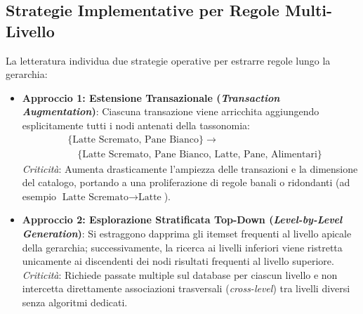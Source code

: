 \FloatBarrier
\subsection{Strategie Implementative per Regole Multi-Livello}
La letteratura individua due strategie operative per estrarre regole lungo la gerarchia:
\begin{itemize}
    \item \textbf{Approccio 1: Estensione Transazionale (\textit{Transaction Augmentation})}: Ciascuna transazione viene arricchita aggiungendo esplicitamente tutti i nodi antenati della tassonomia:
    \begin{equation}
    \begin{split}
    &\{\text{Latte Scremato, Pane Bianco}\} \longrightarrow \\
    &\quad \{\text{Latte Scremato, Pane Bianco, Latte, Pane, Alimentari}\}
    \end{split}
    \end{equation}
    \textit{Criticità}: Aumenta drasticamente l'ampiezza delle transazioni e la dimensione del catalogo, portando a una proliferazione di regole banali o ridondanti (ad esempio $\text{Latte Scremato} \rightarrow \text{Latte}$).
    \item \textbf{Approccio 2: Esplorazione Stratificata Top-Down (\textit{Level-by-Level Generation})}: Si estraggono dapprima gli itemset frequenti al livello apicale della gerarchia; successivamente, la ricerca ai livelli inferiori viene ristretta unicamente ai discendenti dei nodi risultati frequenti al livello superiore.
    \textit{Criticità}: Richiede passate multiple sul database per ciascun livello e non intercetta direttamente associazioni trasversali (\textit{cross-level}) tra livelli diversi senza algoritmi dedicati.
\end{itemize}
